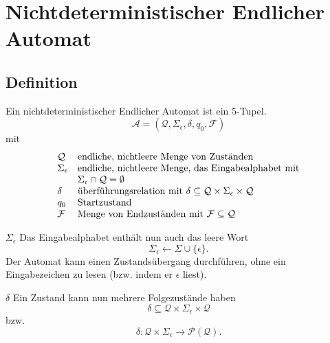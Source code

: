 \documentclass[]{beamer}
\begin{document}
\section{Nichtdeterministischer Endlicher Automat}
\subsection{Definition}
\begin{frame}[squeeze]{}
  \begin{definition}
    Ein nichtdeterministischer Endlicher Automat ist ein 5-Tupel.
    \[\mathcal{A} = (\mathcal{Q}, \Sigma_\epsilon, \delta, q_0, \mathcal{F})\]
    mit
    \[\begin{array}{l l}
        \mathcal{Q}     & \text{endliche, nichtleere Menge von Zust\"anden} \\
        \Sigma_\epsilon & \text{endliche, nichtleere Menge, das Eingabealphabet mit} \\
                        & \Sigma_\epsilon \cap \mathcal{Q} = \emptyset \\
        \delta          & \text{überführungsrelation mit } \delta \subseteq \mathcal{Q} \times \Sigma_\epsilon \times \mathcal{Q} \\
        q_0             & \text{Startzustand} \\
        \mathcal{F}     & \text{Menge von Endzust\"anden mit } \mathcal{F} \subseteq \mathcal{Q} \\
      \end{array}\]
  \end{definition}
\end{frame}

\begin{frame}[<+->][squeeze]{}
  \begin{block}{$\Sigma_\epsilon$}
    Das Eingabealphabet enth\"alt nun auch das leere Wort
    \[\Sigma_\epsilon \leftarrow \Sigma \cup \{\epsilon\}.\]
    Der Automat kann einen Zustandsübergang durchführen, ohne ein Eingabezeichen zu lesen (bzw. indem er $\epsilon$ liest).
  \end{block}
  
  \begin{block}{$\delta$}
    Ein Zustand kann nun mehrere Folgezustände haben
    \[\delta \subseteq \mathcal{Q} \times \Sigma_\epsilon \times \mathcal{Q}\]
    bzw.
    \[\delta : \mathcal{Q} \times \Sigma_\epsilon \rightarrow \mathcal{P(Q)}.\]
  \end{block}
\end{frame}
\end{document}
